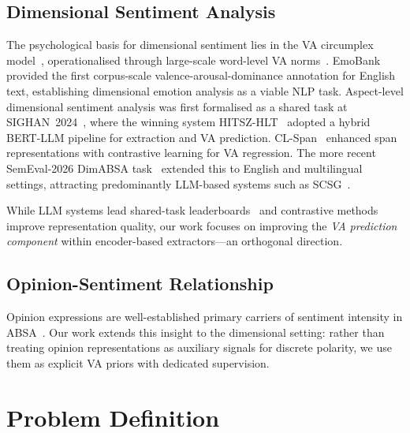 \documentclass[runningheads]{llncs}
\begin{document}
\subsection{Dimensional Sentiment Analysis}

The psychological basis for dimensional sentiment lies in the VA circumplex model~\cite{russell1980circumplex}, operationalised through large-scale word-level VA norms~\cite{warriner2013norms,mohammad2018obtaining}. EmoBank~\cite{buechel2017emobank} provided the first corpus-scale valence-arousal-dominance annotation for English text, establishing dimensional emotion analysis as a viable NLP task. Aspect-level dimensional sentiment analysis was first formalised as a shared task at SIGHAN~2024~\cite{lee2024sighandimabsa}, where the winning system HITSZ-HLT~\cite{hitszSighan2024} adopted a hybrid BERT-LLM pipeline for extraction and VA prediction. CL-Span~\cite{clspanSighan2024} enhanced span representations with contrastive learning for VA regression. The more recent SemEval-2026 DimABSA task~\cite{dimabsa2026} extended this to English and multilingual settings, attracting predominantly LLM-based systems such as SCSG~\cite{scsg2026}.

While LLM systems lead shared-task leaderboards~\cite{zhang2024llm,wang2023chatgpt} and contrastive methods~\cite{mukherjee2023contraste,clspanSighan2024} improve representation quality, our work focuses on improving the \emph{VA prediction component} within encoder-based extractors---an orthogonal direction.

\subsection{Opinion-Sentiment Relationship}

Opinion expressions are well-established primary carriers of sentiment intensity in ABSA~\cite{fan2019target,li2019unified,chen2020synchronous,bao2023opiniontree,li2024opiniontree}. Our work extends this insight to the dimensional setting: rather than treating opinion representations as auxiliary signals for discrete polarity, we use them as explicit VA priors with dedicated supervision.

\section{Problem Definition}
\label{sec:problem}
\end{document}
